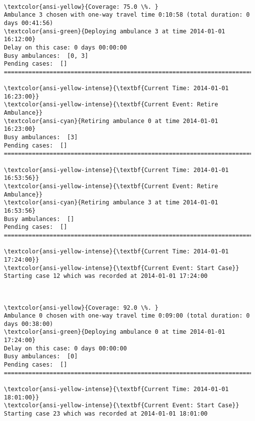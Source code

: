 \documentclass[11pt]{article}
\begin{document}
    \begin{center}
    \end{center}
    { \hspace*{\fill} \\}
    
    \begin{Verbatim}[commandchars=\\\{\}]
\textcolor{ansi-yellow}{Coverage: 75.0 \%. }
Ambulance 3 chosen with one-way travel time 0:10:58 (total duration: 0 days 00:41:56)
\textcolor{ansi-green}{Deploying ambulance 3 at time 2014-01-01 16:12:00}
Delay on this case: 0 days 00:00:00
Busy ambulances:  [0, 3]
Pending cases:  []
========================================================================

\textcolor{ansi-yellow-intense}{\textbf{Current Time: 2014-01-01 16:23:00}}
\textcolor{ansi-yellow-intense}{\textbf{Current Event: Retire Ambulance}}
\textcolor{ansi-cyan}{Retiring ambulance 0 at time 2014-01-01 16:23:00}
Busy ambulances:  [3]
Pending cases:  []
========================================================================

\textcolor{ansi-yellow-intense}{\textbf{Current Time: 2014-01-01 16:53:56}}
\textcolor{ansi-yellow-intense}{\textbf{Current Event: Retire Ambulance}}
\textcolor{ansi-cyan}{Retiring ambulance 3 at time 2014-01-01 16:53:56}
Busy ambulances:  []
Pending cases:  []
========================================================================

\textcolor{ansi-yellow-intense}{\textbf{Current Time: 2014-01-01 17:24:00}}
\textcolor{ansi-yellow-intense}{\textbf{Current Event: Start Case}}
Starting case 12 which was recorded at 2014-01-01 17:24:00

    \end{Verbatim}

    \begin{center}
    \end{center}
    { \hspace*{\fill} \\}
    
    \begin{Verbatim}[commandchars=\\\{\}]
\textcolor{ansi-yellow}{Coverage: 92.0 \%. }
Ambulance 0 chosen with one-way travel time 0:09:00 (total duration: 0 days 00:38:00)
\textcolor{ansi-green}{Deploying ambulance 0 at time 2014-01-01 17:24:00}
Delay on this case: 0 days 00:00:00
Busy ambulances:  [0]
Pending cases:  []
========================================================================

\textcolor{ansi-yellow-intense}{\textbf{Current Time: 2014-01-01 18:01:00}}
\textcolor{ansi-yellow-intense}{\textbf{Current Event: Start Case}}
Starting case 23 which was recorded at 2014-01-01 18:01:00

    \end{Verbatim}
\end{document}
